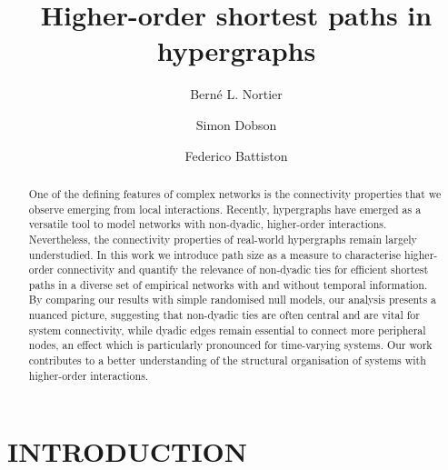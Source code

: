 \documentclass[a4paper,pre,reqno,superscriptaddress, twocolumn, floatfix]{revtex4}
\def\ho{higher-order }
\begin{document}
 

\author{Berné L. Nortier }
%
\author{Simon Dobson} 
%
\author{Federico Battiston}
    
 

\title{Higher-order shortest paths in hypergraphs}

\begin{abstract}
One of the defining features of complex networks is the connectivity properties that we observe emerging from local interactions. %
Recently, hypergraphs have emerged as a versatile tool to model networks with non-dyadic, \ho interactions. Nevertheless, the connectivity properties of real-world hypergraphs remain largely understudied. %
In this work we introduce path size as a measure to characterise \ho connectivity and quantify the relevance of non-dyadic ties for efficient shortest paths in a diverse set of empirical networks with and without temporal information. %
By comparing our results with simple randomised null models, our analysis presents a nuanced picture, suggesting that non-dyadic ties are often central and are vital for system connectivity, while dyadic edges remain essential to connect more peripheral nodes, an effect which is particularly pronounced for time-varying systems. %
Our work contributes to a better understanding of the structural organisation of systems with \ho interactions. %
\end{abstract}

\maketitle



\section*{INTRODUCTION}
\end{document}
